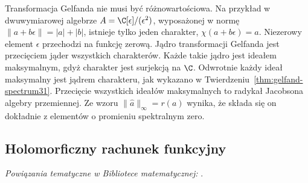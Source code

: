 \begin{uwaga}
Transformacja Gelfanda nie musi być różnowartościowa.
Na przykład w dwuwymiarowej algebrze
$A=\C[\epsilon]/(\epsilon^2)$, wyposażonej w normę
$\|a+b\epsilon\|=|a|+|b|$, istnieje tylko jeden charakter,
$\chi(a+b\epsilon)=a$. Niezerowy element $\epsilon$ przechodzi na
funkcję zerową. Jądro transformacji Gelfanda jest przecięciem jąder
wszystkich charakterów. Każde takie jądro jest ideałem
maksymalnym, gdyż charakter jest surjekcją na $\C$.
Odwrotnie każdy ideał maksymalny jest jądrem charakteru,
jak wykazano w Twierdzeniu~\ref{thm:gelfand-spectrum31}.
Przecięcie wszystkich ideałów maksymalnych to radykał
Jacobsona algebry przemiennej. Ze wzoru
$\|\widehat a\|_\infty=r(a)$ wynika, że składa się on
dokładnie z elementów o promieniu spektralnym zero.
\end{uwaga}

\subsection{Holomorficzny rachunek funkcyjny}

\noindent\emph{Powiązania tematyczne w Bibliotece matematycznej:} .


